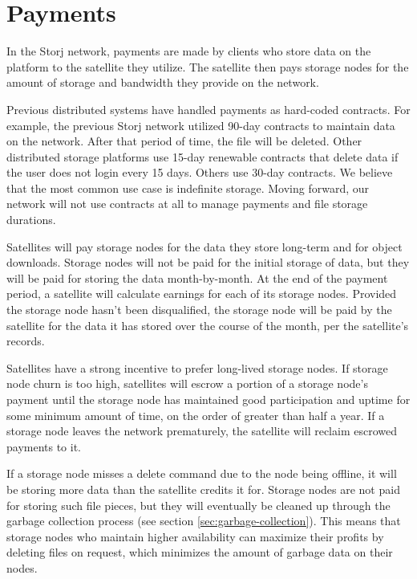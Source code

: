 \documentclass[11pt,fleqn,openany]{book}
\begin{document}
\section{Payments}\label{sec:concrete-payments}

In the Storj network, payments are made by clients who store data on the
platform to the satellite they utilize.
The satellite then pays storage nodes for the amount of storage and bandwidth
they
provide on the network.

Previous distributed systems have handled payments as hard-coded contracts.
For example, the previous Storj network utilized 90-day contracts to maintain
data on the network. After that period of time, the file will be deleted.
Other distributed storage platforms use 15-day renewable contracts that delete
data if the user does not login every 15 days. Others use 30-day contracts.
We believe that the most common use case is indefinite storage.
Moving forward, our network will not use contracts at all to manage payments
and file storage durations.

Satellites will pay storage nodes for the data they store long-term
and for object downloads.
Storage nodes will not be paid for the initial storage of data, but they
will be paid for storing the data month-by-month. At the end of the payment
period, a satellite will calculate earnings for each of its storage nodes.
Provided the storage node hasn't been disqualified,
the storage node will be paid by the satellite for the data it has stored
over the course of
the month, per the satellite's records.

Satellites have a strong incentive to prefer long-lived storage nodes. If
storage node churn is too high, satellites will escrow a portion of a storage
node's payment until the storage node has maintained good participation and
uptime for some minimum amount of time, on the order of greater than half a year.
If a storage node leaves the network prematurely, the satellite will reclaim
escrowed payments to it.

If a storage node misses a delete command due to the node being
offline, it will be storing more data than the satellite credits it for.
Storage nodes are not paid for storing such file pieces, but they
will eventually be cleaned up through the garbage collection process
(see section \ref{sec:garbage-collection}).
This means that storage nodes who maintain higher availability
can maximize their profits by deleting files on request,
which minimizes the amount
of garbage data on their nodes.
\end{document}
